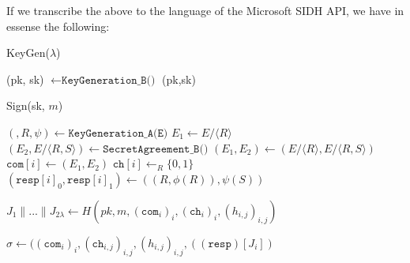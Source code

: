 If we transcribe the above to the language of the Microsoft SIDH API, we have in essense the following:\\

\begin{algorithm}
\caption{KeyGen($\lambda$)}\label{euclid}
\begin{algorithmic}[1]
\State (pk, sk) $\gets \texttt{KeyGeneration\_B()}$
\State \Return (pk,sk)
\end{algorithmic}
\end{algorithm}

\begin{algorithm}
\caption{Sign(sk, $m$)}\label{euclid}
\begin{algorithmic}[1]
	\State $(, R, \psi) \gets \texttt{KeyGeneration\_A(E)}$
	\State $E_{1} \gets E/\langle R \rangle$
	\State $(E_{2},E/\langle R,S \rangle) \gets \texttt{SecretAgreement\_B()}$
	\State $(E_{1},E_{2}) \gets (E/\langle R \rangle, E/\langle R,S \rangle)$
	\State $\texttt{com}[i] \gets (E_{1}, E_{2})$
	\State $\texttt{ch}[i] \gets_{R} \{0,1\}$
	\State $(\texttt{resp}[i]_{0}, \texttt{resp}[i]_{1}) \gets ((R,\phi(R)), \psi(S))$
	
\EndFor

\State $J_{1} \parallel ... \parallel J_{2\lambda} \gets H(pk, m, (\texttt{com}_{i})_{i},(\texttt{ch}_{i})_{i},(h_{i,j})_{i,j})$

\State \Return $\sigma \gets ((\texttt{com}_{i})_{i}, (\texttt{ch}_{i,j})_{i,j}, (h_{i,j})_{i,j}, ((\texttt{resp})[J_{i}])$
\end{algorithmic}
\end{algorithm}

